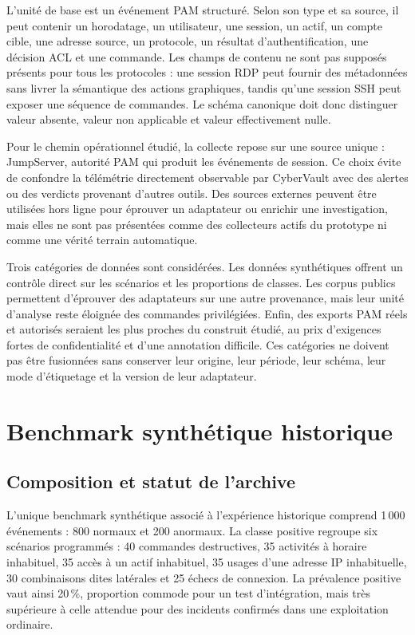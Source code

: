 \documentclass[11pt,a4paper,oneside]{report}
\theoremstyle{definition}
\theoremstyle{plain}
\begin{document}
L'unité de base est un événement PAM structuré. Selon son type et sa source, il
peut contenir un horodatage, un utilisateur, une session, un actif, un compte
cible, une adresse source, un protocole, un résultat d'authentification, une
décision ACL et une commande. Les champs de contenu ne sont pas supposés
présents pour tous les protocoles : une session RDP peut fournir des
métadonnées sans livrer la sémantique des actions graphiques, tandis qu'une
session SSH peut exposer une séquence de commandes. Le schéma canonique doit
donc distinguer valeur absente, valeur non applicable et valeur effectivement
nulle.

Pour le chemin opérationnel étudié, la collecte repose sur une source unique :
JumpServer, autorité PAM qui produit les événements de session. Ce choix évite
de confondre la télémétrie directement observable par CyberVault avec des
alertes ou des verdicts provenant d'autres outils. Des sources externes peuvent
être utilisées hors ligne pour éprouver un adaptateur ou enrichir une
investigation, mais elles ne sont pas présentées comme des collecteurs actifs
du prototype ni comme une vérité terrain automatique.

Trois catégories de données sont considérées. Les données synthétiques offrent
un contrôle direct sur les scénarios et les proportions de classes. Les corpus
publics permettent d'éprouver des adaptateurs sur une autre provenance, mais
leur unité d'analyse reste éloignée des commandes privilégiées. Enfin, des
exports PAM réels et autorisés seraient les plus proches du construit étudié,
au prix d'exigences fortes de confidentialité et d'une annotation difficile.
Ces catégories ne doivent pas être fusionnées sans conserver leur origine,
leur période, leur schéma, leur mode d'étiquetage et la version de leur
adaptateur.

\section{Benchmark synthétique historique}
\label{sec:data-historical-benchmark}

\subsection{Composition et statut de l'archive}

L'unique benchmark synthétique associé à l'expérience historique comprend
1\,000 événements : 800 normaux et 200 anormaux. La classe positive regroupe
six scénarios programmés : 40 commandes destructives, 35 activités à horaire
inhabituel, 35 accès à un actif inhabituel, 35 usages d'une adresse IP
inhabituelle, 30 combinaisons dites latérales et 25 échecs de connexion. La
prévalence positive vaut ainsi 20\,\%, proportion commode pour un test
d'intégration, mais très supérieure à celle attendue pour des incidents
confirmés dans une exploitation ordinaire.
\end{document}
